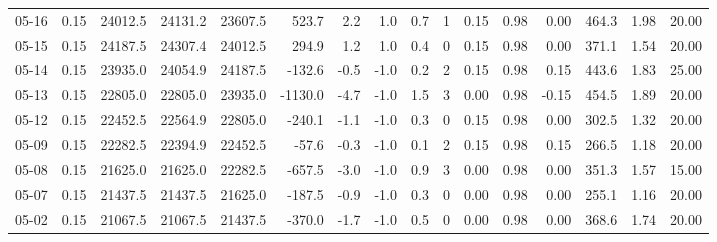 \begin{threeparttable}
{\begin{tabular}{lrrrrrrrrrrrrrrr}
  05-16 &     0.15 & 24012.5 & 24131.2 & 23607.5 &      523.7 &            2.2 &                      1.0 &                 0.7 &              1 &       0.15 &      0.98 &           0.00 &            464.3 &            1.98 &                  20.00 \\
  05-15 &     0.15 & 24187.5 & 24307.4 & 24012.5 &      294.9 &            1.2 &                      1.0 &                 0.4 &              0 &       0.15 &      0.98 &           0.00 &            371.1 &            1.54 &                  20.00 \\
  05-14 &     0.15 & 23935.0 & 24054.9 & 24187.5 &     -132.6 &           -0.5 &                     -1.0 &                 0.2 &              2 &       0.15 &      0.98 &           0.15 &            443.6 &            1.83 &                  25.00 \\
  05-13 &     0.15 & 22805.0 & 22805.0 & 23935.0 &    -1130.0 &           -4.7 &                     -1.0 &                 1.5 &              3 &       0.00 &      0.98 &          -0.15 &            454.5 &            1.89 &                  20.00 \\
  05-12 &     0.15 & 22452.5 & 22564.9 & 22805.0 &     -240.1 &           -1.1 &                     -1.0 &                 0.3 &              0 &       0.15 &      0.98 &           0.00 &            302.5 &            1.32 &                  20.00 \\
  05-09 &     0.15 & 22282.5 & 22394.9 & 22452.5 &      -57.6 &           -0.3 &                     -1.0 &                 0.1 &              2 &       0.15 &      0.98 &           0.15 &            266.5 &            1.18 &                  20.00 \\
  05-08 &     0.15 & 21625.0 & 21625.0 & 22282.5 &     -657.5 &           -3.0 &                     -1.0 &                 0.9 &              3 &       0.00 &      0.98 &           0.00 &            351.3 &            1.57 &                  15.00 \\
  05-07 &     0.15 & 21437.5 & 21437.5 & 21625.0 &     -187.5 &           -0.9 &                     -1.0 &                 0.3 &              0 &       0.00 &      0.98 &           0.00 &            255.1 &            1.16 &                  20.00 \\
  05-02 &     0.15 & 21067.5 & 21067.5 & 21437.5 &     -370.0 &           -1.7 &                     -1.0 &                 0.5 &              0 &       0.00 &      0.98 &           0.00 &            368.6 &            1.74 &                  20.00 \\

\end{tabular}}
\end{threeparttable}

